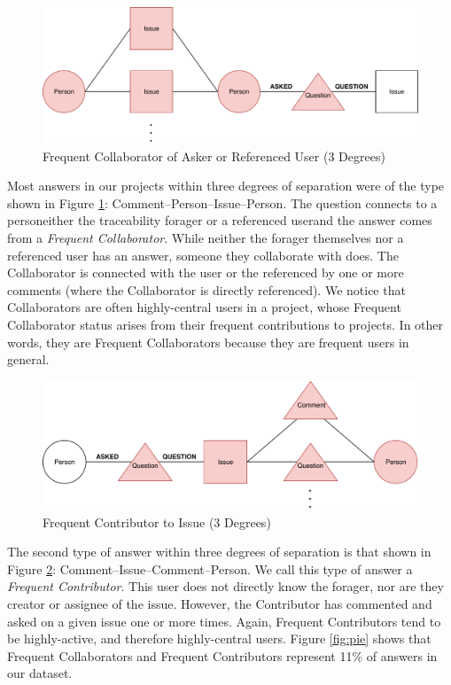 \documentclass[conference]{IEEEtran}
\begin{document}
\begin{figure}[ht]
	\centering
	\includegraphics[width=\linewidth]{img/3degCollab.pdf}
	\caption{Frequent Collaborator of Asker or Referenced User (3 Degrees)}
	\label{fig:3degCollab}
\end{figure}

Most answers in our projects within three degrees of separation were of the type shown in Figure \ref{fig:3degCollab}: Comment--Person--Issue--Person. The question connects to a person\textemdash either the traceability forager or a referenced user\textemdash and the answer comes from a \textit{Frequent Collaborator}. While neither the forager themselves nor a referenced user has an answer, someone they collaborate with does. The Collaborator is connected with the user or the referenced by one or more comments (where the Collaborator is directly referenced). We notice that Collaborators are often highly-central users in a project, whose Frequent Collaborator status arises from their frequent contributions to projects. In other words, they are Frequent Collaborators because they are frequent users in general.

\begin{figure}[ht]
	\centering
	\includegraphics[width=\linewidth]{img/3degContrib.pdf}
	\caption{Frequent Contributor to Issue (3 Degrees)}
	\label{fig:3degContrib}
\end{figure}

The second type of answer within three degrees of separation is that shown in Figure \ref{fig:3degContrib}: Comment--Issue--Comment--Person. We call this type of answer a \textit{Frequent Contributor}. This user does not directly know the forager, nor are they creator or assignee of the issue. However, the Contributor has commented and asked on a given issue one or more times. Again, Frequent Contributors tend to be highly-active, and therefore highly-central users. Figure \ref{fig:pie} shows that Frequent Collaborators and Frequent Contributors represent 11\% of answers in our dataset.
\end{document}
